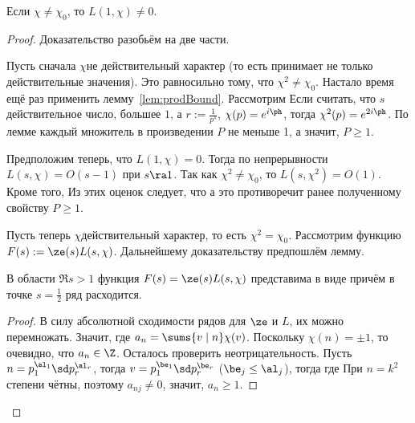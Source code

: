 \documentclass[a4paper]{article}
\begin{document}
\begin{theorem}
\label{thm:noZeroLFunction}
Если $\chi\neq \chi_0$, то $L(1,\chi)\neq0$.
\end{theorem}
\begin{proof}
Доказательство разобьём на две части.

 Пусть сначала $\chi$\т не действительный характер (то есть принимает не только действительные значения).
Это равносильно тому, что $\chi^2\neq \chi_0$. Настало время ещё раз применить лемму~\ref{lem:prodBound}. Рассмотрим
Если считать, что $s$\т действительное число, большее $1$, а $r:=\frac{1}{p^s}$, $\chi(p)= e^{i\ph}$, тогда
$\chi^2(p)=e^{2i\ph}$. По лемме каждый множитель в произведении $P$ не меньше 1, а значит, $P\ge1$.

Предположим теперь, что $L(1,\chi)=0$. Тогда по непрерывности $L(s,\chi)=O(s-1)$ при $s\ra1$.
Так как $\chi^2\neq \chi_0$, то $L(s,\chi^2)=O(1)$. Кроме того,
Из этих оценок следует, что
а это противоречит ранее полученному свойству $P\ge1$.

 Пусть теперь $\chi$\т действительный характер, то есть $\chi^2=\chi_0$. Рассмотрим функцию
$F(s):=\ze(s)L(s,\chi)$. Дальнейшему доказательству предпошлём лемму.
\begin{lemma}
В области $\Re s>1$ функция $F(s) = \ze(s) L(s,\chi)$ представима в виде
причём в точке $s = \frac12$ ряд расходится.
\end{lemma}
\begin{proof}
В силу абсолютной сходимости рядов для $\ze$ и $L$, их можно перемножать. Значит,
где $a_n=\sums{v\mid n}\chi(v)$. Поскольку $\chi(n)=\pm 1$, то очевидно, что $a_n\in\Z$. Осталось проверить
неотрицательность. Пусть $n=p_1^{\al_1}\sd p_r^{\al_r}$, тогда $v=p_1^{\be_1}\sd p_r^{\be_r}$ ($\be_j\le\al_j$),
тогда
где
При $n=k^2$ степени чётны, поэтому $a_{nj}\neq0$, значит, $a_n\ge1$.


\end{proof}
\end{proof}
\end{document}
